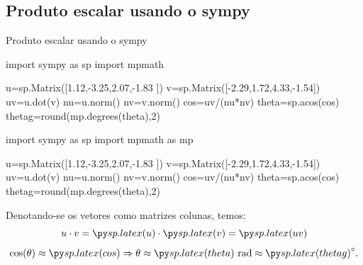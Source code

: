 \subsection*{Produto escalar usando o sympy}
\begin{frame}[label=vetores2,fragile=singleslide]{Produto escalar usando o sympy}

	\begin{footnotesize}
\begin{pyverbatim}
import sympy as sp
import mpmath

u=sp.Matrix([1.12,-3.25,2.07,-1.83 ])
v=sp.Matrix([-2.29,1.72,4.33,-1.54])
uv=u.dot(v)
nu=u.norm()
nv=v.norm()
cos=uv/(nu*nv)
theta=sp.acos(cos)
thetag=round(mp.degrees(theta),2)
\end{pyverbatim}
	\end{footnotesize}	

\begin{pycode}
import sympy as sp
import mpmath as mp

u=sp.Matrix([1.12,-3.25,2.07,-1.83 ])
v=sp.Matrix([-2.29,1.72,4.33,-1.54])
uv=u.dot(v)
nu=u.norm()
nv=v.norm()
cos=uv/(nu*nv)
theta=sp.acos(cos)
thetag=round(mp.degrees(theta),2)
\end{pycode}
Denotando-se os vetores como matrizes colunas, temos:
\[u\cdot v=\pyl{u}\cdot \pyl{v}=\pyl{uv}\]
\[\cos(\theta)\approx\pyl{cos}\Rightarrow \theta\approx\pyl{theta} \text{ rad}\approx \pyl{thetag}^\circ.\]
\end{frame}




